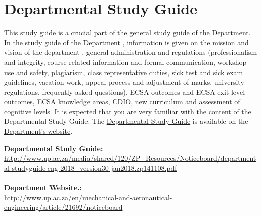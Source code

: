 \section{Departmental Study Guide} \label{sec:dep_study_guide}
    This study guide is a crucial part of the general study guide of the
    Department. In the study guide of the Department , information is given on
    the mission and vision of the department , general administration and
    regulations (professionalism and integrity, course related information and
    formal communication, workshop use and safety, plagiarism, class
    representative duties, sick test and sick exam guidelines, vacation work,
    appeal process and adjustment of marks, university regulations, frequently
    asked questions), ECSA outcomes and ECSA exit level outcomes, ECSA
    knowledge areas, CDIO, new curriculum and assessment of cognitive levels.
    It is expected that you are very familiar with the content of the
    Departmental Study Guide. The
    \href{http://www.up.ac.za/media/shared/120/ZP_Resources/Noticeboard/departmental-studyguide-eng-2018_version30-jan2018.zp141108.pdf}{Departmental Study Guide}
    is available on the
    \href{http://www.up.ac.za/en/mechanical-and-aeronautical-engineering/article/21692/noticeboard}{Department’s website}.


    \noindent
    \textbf{Departmental Study Guide:} \\
    \url{http://www.up.ac.za/media/shared/120/ZP_Resources/Noticeboard/departmental-studyguide-eng-2018_version30-jan2018.zp141108.pdf} \\~\\
    \textbf{Department Website.:} \\
    \url{http://www.up.ac.za/en/mechanical-and-aeronautical-engineering/article/21692/noticeboard} \\~\\

